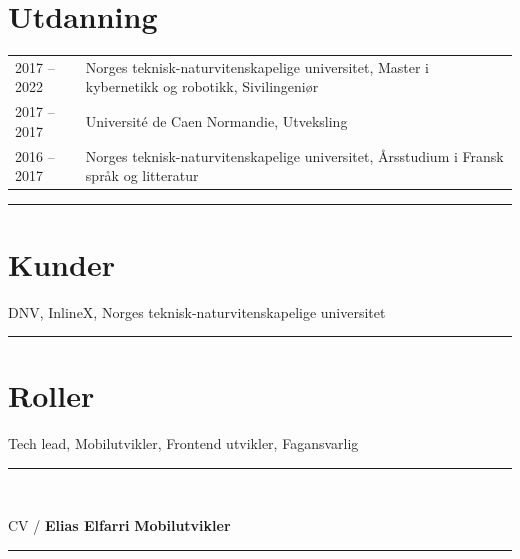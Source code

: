 \documentclass[a4paper,10pt]{article}
\begin{document}
\begin{paracol}{2}
\section{\ubuntu Utdanning}
\renewcommand{\arraystretch}{1.3} %
\begin{tabularx}{\columnwidth}{@{}l>{\raggedright\arraybackslash}X@{}}
2017 -- 2022 & Norges teknisk-naturvitenskapelige universitet, Master i kybernetikk og robotikk, Sivilingeniør \\
2017 -- 2017 & Université de Caen Normandie, Utveksling \\
2016 -- 2017 & Norges teknisk-naturvitenskapelige universitet, Årsstudium i Fransk språk og litteratur \\
\end{tabularx}

\vspace{0.5em} 
\noindent\rule{\linewidth}{0.2pt}


\section{\ubuntu Kunder}
DNV, \hspace{0.1em} 
InlineX, \hspace{0.1em} 
Norges teknisk-naturvitenskapelige
universitet

\vspace{0.5em} 
\noindent\rule{\linewidth}{0.2pt}

\section{\ubuntu Roller}
Tech lead, \hspace{0.1em}
Mobilutvikler, \hspace{0.1em}
Frontend utvikler, \hspace{0.1em}
Fagansvarlig

\end{paracol}

\vfill
\noindent\rule{\linewidth}{0.5pt}\\
\hfill 

\newpage
\noindent CV / \textbf{Elias Elfarri} \hfill \textbf{Mobilutvikler} \\
\rule{\linewidth}{0.5pt}

  

\end{document}
